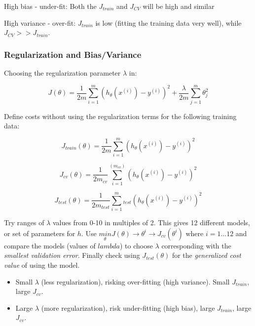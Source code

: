 \documentclass{article}
\begin{document}
High bias - under-fit: Both the $J_{train}$ and $J_{CV}$ will be high and similar 

High variance - over-fit: $J_{train}$ is low (fitting the training data very well), while $J_{CV} >> J_{train}$.



\subsubsection{Regularization and Bias/Variance}

Choosing the regularization parameter $\lambda$ in:

\begin{equation}
    J(\theta) = \frac{1}{2m} \sum_{i=1}^m \left( h_{\theta} (x^{(i)}) - y^{(i)} \right)^2 + \frac{\lambda}{2m} \sum_{j=1}^{m} \theta_j^2
\end{equation}


Define costs without using the regularization terms for the following training data:

\begin{equation}
    J_{train}(\theta) = \frac{1}{2m} \sum_{i=1}^m \left( h_{\theta} (x^{(i)}) - y^{(i)} \right)^2
\end{equation}

\begin{equation}
    J_{cv}(\theta) = \frac{1}{2m_{cv}} \sum_{i=1}^{(m_{cv})} \left( h_{\theta} (x^{(i)}) - y^{(i)} \right)^2
\end{equation}

\begin{equation}
    J_{test}(\theta) = \frac{1}{2m_{test}} \sum_{i=1}^m_{test} \left( h_{\theta} (x^{(i)}) - y^{(i)} \right)^2
\end{equation}

\begin{mybox}

Try ranges of $\lambda$ values from 0-10 in multiples of 2. This gives 12 different models, or set of parameters for $h$. Use $\underset{\theta}{min}{J(\theta)} \longrightarrow \theta^i \longrightarrow J_{cv} (\theta^i)$ where $i = 1 ... 12$ and compare the models (values of $lambda$) to choose $\lambda$ corresponding with the \textit{smallest validation error}. Finally check using $J_{test} (\theta)$ for the \textit{generalized cost value} of using the model.


\begin{itemize}
\item Small $\lambda$ (less regularization), risking over-fitting (high variance). Small $J_{train}$, large $J_{cv}$.

\item Large $\lambda$ (more regularization), risk under-fitting (high bias), large $J_{train}$, large $J_{cv}$.
\end{itemize}
\end{mybox}
\end{document}
